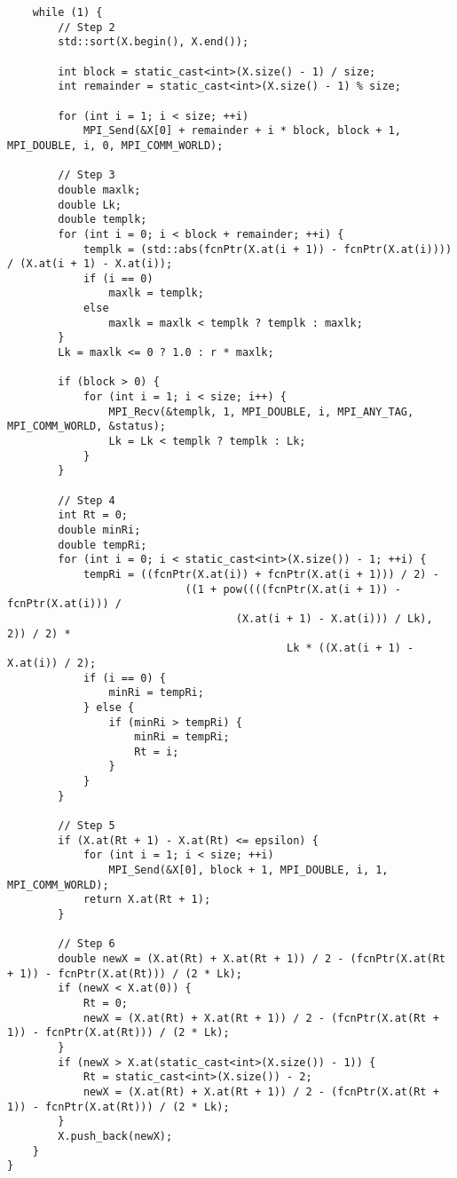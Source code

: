\documentclass{report}
\begin{document}
\begin{lstlisting}
    while (1) {
        // Step 2
        std::sort(X.begin(), X.end());

        int block = static_cast<int>(X.size() - 1) / size;
        int remainder = static_cast<int>(X.size() - 1) % size;

        for (int i = 1; i < size; ++i)
            MPI_Send(&X[0] + remainder + i * block, block + 1, MPI_DOUBLE, i, 0, MPI_COMM_WORLD);

        // Step 3
        double maxlk;
        double Lk;
        double templk;
        for (int i = 0; i < block + remainder; ++i) {
            templk = (std::abs(fcnPtr(X.at(i + 1)) - fcnPtr(X.at(i)))) / (X.at(i + 1) - X.at(i));
            if (i == 0)
                maxlk = templk;
            else
                maxlk = maxlk < templk ? templk : maxlk;
        }
        Lk = maxlk <= 0 ? 1.0 : r * maxlk;

        if (block > 0) {
            for (int i = 1; i < size; i++) {
                MPI_Recv(&templk, 1, MPI_DOUBLE, i, MPI_ANY_TAG, MPI_COMM_WORLD, &status);
                Lk = Lk < templk ? templk : Lk;
            }
        }

        // Step 4
        int Rt = 0;
        double minRi;
        double tempRi;
        for (int i = 0; i < static_cast<int>(X.size()) - 1; ++i) {
            tempRi = ((fcnPtr(X.at(i)) + fcnPtr(X.at(i + 1))) / 2) -
                            ((1 + pow((((fcnPtr(X.at(i + 1)) - fcnPtr(X.at(i))) /
                                    (X.at(i + 1) - X.at(i))) / Lk), 2)) / 2) *
                                            Lk * ((X.at(i + 1) - X.at(i)) / 2);
            if (i == 0) {
                minRi = tempRi;
            } else {
                if (minRi > tempRi) {
                    minRi = tempRi;
                    Rt = i;
                }
            }
        }

        // Step 5
        if (X.at(Rt + 1) - X.at(Rt) <= epsilon) {
            for (int i = 1; i < size; ++i)
                MPI_Send(&X[0], block + 1, MPI_DOUBLE, i, 1, MPI_COMM_WORLD);
            return X.at(Rt + 1);
        }

        // Step 6
        double newX = (X.at(Rt) + X.at(Rt + 1)) / 2 - (fcnPtr(X.at(Rt + 1)) - fcnPtr(X.at(Rt))) / (2 * Lk);
        if (newX < X.at(0)) {
            Rt = 0;
            newX = (X.at(Rt) + X.at(Rt + 1)) / 2 - (fcnPtr(X.at(Rt + 1)) - fcnPtr(X.at(Rt))) / (2 * Lk);
        }
        if (newX > X.at(static_cast<int>(X.size()) - 1)) {
            Rt = static_cast<int>(X.size()) - 2;
            newX = (X.at(Rt) + X.at(Rt + 1)) / 2 - (fcnPtr(X.at(Rt + 1)) - fcnPtr(X.at(Rt))) / (2 * Lk);
        }
        X.push_back(newX);
    }
}


\end{lstlisting}
\end{document}
